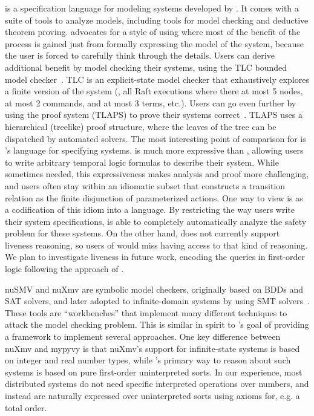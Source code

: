 \TLA is a specification language for modeling systems
developed by \citet{lamport:tla,lamport:specifying-systems}.
%
It comes with a suite of tools to analyze models,
including tools for model checking and deductive theorem proving.
%
\citeauthor{lamport:tla} advocates for a style of using \TLA
where most of the benefit of the process is gained
just from formally expressing the model of the system,
because the user is forced to carefully think through the details.
%
Users can derive additional benefit by model checking their systems,
using the TLC bounded model checker~\cite{tlc}.
%
TLC is an explicit-state model checker that exhaustively explores
a finite version of the system (\eg, all Raft executions where
there at most 5 nodes, at most 2 commands, and at most 3 terms, etc.).
%
Users can go even further by using the \TLA proof system (TLAPS)
to prove their systems correct~\cite{tlaps}.
%
TLAPS uses a hierarchical (treelike) proof structure,
where the leaves of the tree can be dispatched by automated solvers.
%
The most interesting point of comparison for \mypyvy is
\TLA's language for specifying systems.
%
\TLA is much more expressive than \mypyvy,
allowing users to write arbitrary temporal logic formulas
to describe their system.
%
While sometimes needed, this expressiveness makes
analysis and proof more challenging,
and users often stay within an idiomatic subset that
constructs a transition relation as the finite disjunction of
parameterized actions.
%
One way to view \mypyvy is as a codification of this idiom into a language.
%
By restricting the way users write their system specifications,
\mypyvy is able to completely automatically analyze
the safety problem for these systems.
%
On the other hand, \mypyvy does not currently support liveness reasoning,
so users of \TLA would miss having access to that kind of reasoning.
%
We plan to investigate liveness in future work,
encoding the queries in first-order logic
following the approach of \citet{padon:reducing-liveness}.

nuSMV and nuXmv are symbolic model checkers,
originally based on BDDs and SAT solvers,
and later adopted to infinite-domain systems
by using SMT solvers~.
%
These tools are ``workbenches'' that implement many different techniques
to attack the model checking problem.
%
This is similar in spirit to \mypyvy's goal of
providing a framework to implement several approaches.
%
One key difference between nuXmv and mypyvy is that
nuXmv's support for infinite-state systems
is based on integer and real number types,
while \mypyvy's primary way to reason about such systems
is based on pure first-order uninterpreted sorts.
%
In our experience, most distributed systems do not need
specific interpreted operations over numbers,
and instead are naturally expressed over uninterpreted sorts
using axioms for, e.g. a total order.

